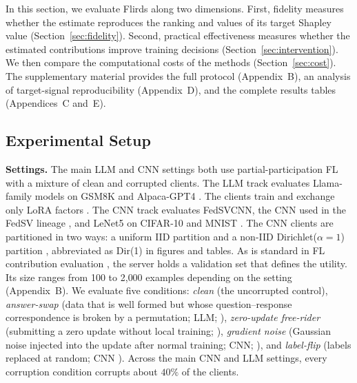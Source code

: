 \documentclass[letterpaper]{article} %
\theoremstyle{definition} %
\begin{document}
In this section, we evaluate Flirds along two
dimensions. First, fidelity measures whether the estimate reproduces the
ranking and values of its target Shapley value
(Section~\ref{sec:fidelity}). Second, practical effectiveness measures whether
the estimated contributions improve training decisions
(Section~\ref{sec:intervention}). We then compare the computational costs of
the methods (Section~\ref{sec:cost}). The supplementary material provides the
full protocol (Appendix~B), an analysis of target-signal reproducibility
(Appendix~D), and the complete results tables (Appendices~C and~E).

\subsection{Experimental Setup}
\label{sec:setup}

\textbf{Settings.} The main LLM and CNN settings both use partial-participation
FL with a mixture of clean and corrupted clients. The LLM track evaluates
Llama-family models
\citep{grattafiori2024llama,touvron2023llama} on GSM8K
\citep{cobbe2021training} and Alpaca-GPT4 \citep{peng2023instruction}. The
clients train and exchange only LoRA factors \citep{hu2022lora}. 
The CNN track evaluates FedSVCNN, the CNN used in the FedSV
lineage \citep{wang2020principled,fan2022improving}, and LeNet5
\citep{lecun1998gradient} on CIFAR-10 \citep{krizhevsky2009learning}
and MNIST \citep{lecun1998gradient}. The CNN clients are partitioned in two
ways: a uniform IID partition
and a non-IID Dirichlet($\alpha{=}1$) partition \citep{hsu2019measuring},
abbreviated as Dir(1) in figures and tables. As is standard in FL contribution
evaluation \citep{wang2020principled,liu2022gtg,fan2022improving}, the server
holds a validation set that defines the utility. Its size ranges from 100 to
2{,}000 examples depending on the setting (Appendix~B). We evaluate five
conditions: \emph{clean} (the uncorrupted control), \emph{answer-swap}
(data that is well formed but whose question--response correspondence is
broken by a permutation; LLM; \citealp{xu2024instructions}), \emph{zero-update free-rider} (submitting a
zero update without local training; \citealp{lin2019free}), \emph{gradient
noise} (Gaussian noise injected into the update after normal training; CNN; \citealp{blanchard2017machine}),
and \emph{label-flip}
(labels replaced at random; CNN \citealp{xu2022fedcorr}). Across the main CNN and LLM settings, every corruption condition corrupts about
$40\%$ of the clients. 
\end{document}
